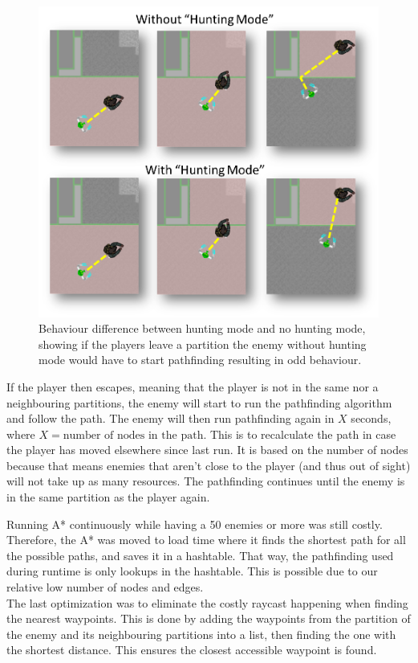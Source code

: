 \begin{figure}[H]
        \includegraphics[width=\textwidth]{figures/astar/huntingMode.png}
    \caption{Behaviour difference between hunting mode and no hunting mode, showing if the players leave a partition the enemy without hunting mode would have to start pathfinding resulting in odd behaviour.}\label{huntingMode}
\end{figure}

If the player then escapes, meaning that the player is not in the same nor a neighbouring partitions, the enemy will start to run the pathfinding algorithm and follow the path.
The enemy will then run pathfinding again in $X$ seconds, where $X = \text{number of nodes in the path}$.
This is to recalculate the path in case the player has moved elsewhere since last run.
It is based on the number of nodes because that means enemies that aren't close to the player (and thus out of sight) will not take up as many resources.
The pathfinding continues until the enemy is in the same partition as the player again.

Running A* continuously while having a 50 enemies or more was still costly.
Therefore, the A* was moved to load time where it finds the shortest path for all the possible paths, and saves it in a hashtable.
That way, the pathfinding used during runtime is only lookups in the hashtable.
This is possible due to our relative low number of nodes and edges.\\
The last optimization was to eliminate the costly raycast happening when finding the nearest waypoints. 
This is done by adding the waypoints from the partition of the enemy and its neighbouring partitions into a list, then finding the one with the shortest distance. 
This ensures the closest accessible waypoint is found.

